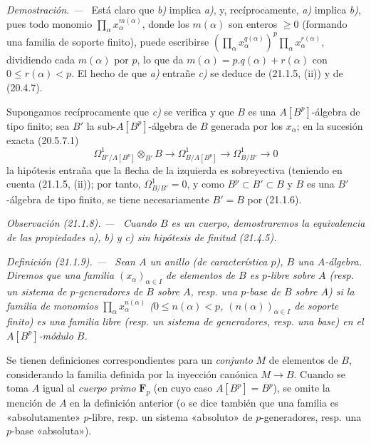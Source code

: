 \documentclass[10pt,oneside]{book}
\makeatletter
\newcommand{\setmanualcurrentlabel}[1]{\def\@currentlabel{#1}}
\newenvironment{definition}[1][]{%
  \setmanualcurrentlabel{#1}\par\medskip\noindent\itshape Definición (#1). ---\ }{\par}
\newenvironment{remark}[1][]{%
  \setmanualcurrentlabel{#1}\par\medskip\noindent\itshape Observación (#1). ---\ }{\par}
\newenvironment{proof}{%
  \par\medskip\noindent\textit{Demostración. ---\ }}{\par}
\makeatother
\begin{document}
\begin{proof}
Está claro que \emph{b)} implica \emph{a)}, y, recíprocamente, \emph{a)} implica \emph{b)}, pues todo
monomio $\prod_\alpha x_\alpha^{m(\alpha)}$, donde los $m(\alpha)$ son
enteros $\geq0$ (formando una familia de soporte finito), puede escribirse
$(\prod_\alpha x_\alpha^{q(\alpha)})^p\prod_\alpha x_\alpha^{r(\alpha)}$,
dividiendo cada $m(\alpha)$ por $p$, lo que da
$m(\alpha)=p.q(\alpha)+r(\alpha)$ con $0\leq r(\alpha)<p$.
El hecho de que \emph{a)} entrañe \emph{c)} se deduce de (21.1.5, (ii)) y de (20.4.7).

Supongamos recíprocamente que \emph{c)} se verifica y que $B$ es una
$A[B^p]$-álgebra de tipo finito; sea $B'$ la sub-$A[B^p]$-álgebra de $B$
generada por los $x_\alpha$; en la sucesión exacta (20.5.7.1)
\[
\Omega^1_{B'/A[B^p]}\otimes_{B'}B\longrightarrow
\Omega^1_{B/A[B^p]}\longrightarrow\Omega^1_{B/B'}\longrightarrow0
\]
la hipótesis entraña que la flecha de la izquierda es sobreyectiva (teniendo
en cuenta (21.1.5, (ii)); por tanto, $\Omega^1_{B/B'}=0$, y como
$B^p\subset B'\subset B$ y $B$ es una $B'$-álgebra de tipo finito, se tiene
necesariamente $B'=B$ por (21.1.6).
\end{proof}

\begin{remark}[21.1.8]
\label{0.21.1.8-es}
Cuando $B$ es un \emph{cuerpo}, demostraremos la equivalencia de las propiedades \emph{a)},
\emph{b)} y \emph{c)} sin hipótesis de finitud (21.4.5).
\end{remark}

\begin{definition}[21.1.9]
\label{0.21.1.9-es}
Sean $A$ un anillo (de característica $p$), $B$ una $A$-álgebra. Diremos
que una familia $(x_\alpha)_{\alpha\in I}$ de elementos de $B$ es
$p$-libre sobre $A$ (\textup{resp.} un sistema de $p$-generadores de $B$ sobre $A$,
\textup{resp.} una $p$-base de $B$ sobre $A$) si la familia de monomios
$\prod_\alpha x_\alpha^{n(\alpha)}$ ($0\leq n(\alpha)<p$,
$(n(\alpha))_{\alpha\in I}$ de soporte finito) es una familia libre (\textup{resp.}
un sistema de generadores, \textup{resp.} una base) en el $A[B^p]$-módulo $B$.
\end{definition}

Se tienen definiciones correspondientes para un \emph{conjunto} $M$ de elementos de
$B$, considerando la familia definida por la inyección canónica $M\to B$.
Cuando se toma $A$ igual al \emph{cuerpo primo} $\mathbf F_p$ (en cuyo caso
$A[B^p]=B^p$), se omite la mención de $A$ en la definición anterior (o se
dice también que una familia es «absolutamente» $p$-libre, resp. un sistema
«absoluto» de $p$-generadores, resp. una $p$-base «absoluta»).
\end{document}
